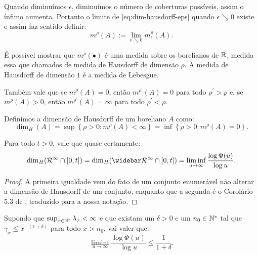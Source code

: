 Quando diminuímos $\epsilon$, diminuímos o número de coberturas
possíveis, assim o ínfimo aumenta. Portanto o limite de
\eqref{eq:dim-hausdorff-eps} quando $\epsilon \searrow 0$ existe e
assim faz sentido definir:
\begin{displaymath}
  m^\rho(A) := \lim_{\epsilon \searrow 0} m^\rho_\epsilon (A).
\end{displaymath}

É possível mostrar que $m^\rho(\bullet)$ é uma medida sobre os
borelianos de ${\mathbb{R}}$, medida essa que chamados de medida de Hausdorff de
dimensão $\rho$.  A medida de Hausdorff de dimensão $1$ é a medida de
Lebesgue.

Também vale que se $m^\rho(A) = 0$, então $m^{\rho^\prime}(A) = 0$ para
todo $\rho^\prime > \rho$ e, se $m^\rho(A) > 0$, então $m^{\rho^\prime}(A)
= \infty$ para todo $\rho^\prime < \rho$.

\begin{definicao}
  Definimos a dimensão de Hausdorff de um boreliano $A$ como:
  \begin{displaymath}
    \dim_H(A) = \sup \left\{ \rho > 0 : m^\rho(A) < \infty \right\}
    = \inf \left\{ \rho > 0: m^\rho(A) = 0 \right\}.
  \end{displaymath}
\end{definicao}

\begin{teorema}
  \label{teo:dim-hausdorff}
  Para todo $t > 0$, vale que quase certamente:
  \begin{equation}
    \label{eq:dim-hausdorff}
    \dim_H(\RR^\infty \cap [0, t]) = 
    \dim_H(\RRb^\infty \cap [0, t]) =
    \liminf_{u \to \infty} \frac{\log \Phi(u)}{\log u}.
  \end{equation}
\end{teorema}
\begin{proof}
  A primeira igualdade vem do fato de um conjunto enumerável não
  alterar a dimensão de Hausdorff de um conjunto, enquanto que a
  segunda é o Corolário 5.3 de \cite{bertoin:97}, traduzido para a
  nossa notação.
\end{proof}

\begin{proposicao}
  \label{prop:dominar-dim-haus-sup}
  Supondo que $\sup_{x\in{\mathbb{N^*}}}\lambda_x < \infty$ e que existam um
  $\delta>0$ e um $n_0 \in {\mathbb{N^*}}$ tal que $\gamma_x \leq x^{-(1+\delta)}$
  para todo $x > n_0$, vai valer que:
  \begin{equation}
    \liminf_{u \to \infty} \frac{\log \Phi(u)}{\log u}  \leq
    \frac{1}{1+\delta} .
  \end{equation}
\end{proposicao}

